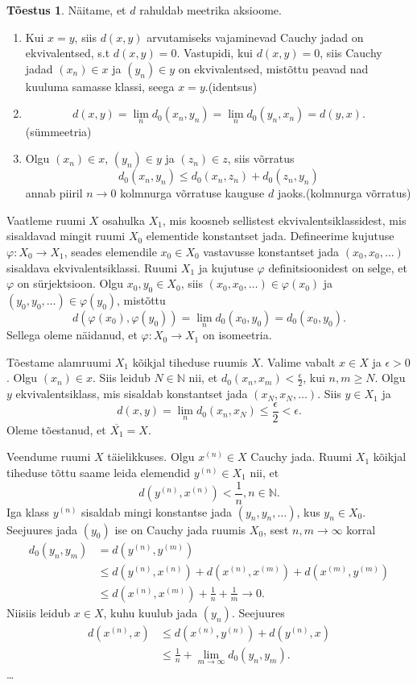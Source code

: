 \documentclass{article}[12pt]
\newcommand{\N}{\mathbb{N}}
\theoremstyle{definition}
\theoremstyle{definition}
\theoremstyle{definition}
\theoremstyle{break}
\newtheorem*{toestus}{Tõestus}
\begin{document}
\begin{toestus}
	Näitame, et $d$ rahuldab meetrika aksioome.
	\begin{enumerate}
		\item Kui $x=y$, siis $d(x,y)$ arvutamiseks vajaminevad Cauchy jadad on ekvivalentsed, s.t $d(x,y) = 0$.
		Vastupidi, kui $d(x,y)=0$, siis Cauchy jadad $(x_n)\in x$ ja $(y_n)\in y$ on ekvivalentsed, mistõttu peavad nad kuuluma samasse klassi, seega $x=y$.\hfill (identsus)
		\item 
		\[
			d(x,y) = \lim_n d_0(x_n,y_n) = \lim_n d_0(y_n,x_n) = d(y,x).
		\]
		\hfill (sümmeetria)
		\item Olgu $(x_n)\in x$, $(y_n)\in y$ ja $(z_n)\in z$, siis võrratus
		\[
			d_0(x_n,y_n) \leq d_0(x_n,z_n) + d_0(z_n,y_n)
		\]
		annab piiril $n\rightarrow 0$ kolmnurga võrratuse kauguse $d$ jaoks.\hfill (kolmnurga võrratus)
	\end{enumerate}
	
	Vaatleme ruumi $X$ osahulka $X_1$, mis koosneb sellistest ekvivalentsiklassidest, mis sisaldavad mingit ruumi $X_0$ elementide konstantset jada.
	Defineerime kujutuse $\varphi:X_0\rightarrow X_1$, seades elemendile $x_0\in X_0$ vastavusse konstantset jada $(x_0,x_0,\dots)$ sisaldava ekvivalentsiklassi.
	Ruumi $X_1$ ja kujutuse $\varphi$ definitsioonidest on selge, et $\varphi$ on sürjektsioon. Olgu $x_0,y_0\in X_0$, siis $(x_0,x_0,\dots)\in\varphi(x_0)$ ja $(y_0,y_0,\dots)\in\varphi(y_0)$, mistõttu
	\[
		d(\varphi(x_0),\varphi(y_0)) = \lim_n d_0(x_0,y_0) = d_0(x_0,y_0).
	\]
	Sellega oleme näidanud, et $\varphi: X_0\rightarrow X_1$ on isomeetria.

	Tõestame alamruumi $X_1$ kõikjal tiheduse ruumis $X$. Valime vabalt $x\in X$ ja $\epsilon > 0$. Olgu $(x_n)\in x$. Siis leidub $N\in\N$ nii, et $d_0(x_n,x_m) < \frac{\epsilon}{2}$, kui $n,m \geq N$. Olgu $y$ ekvivalentsiklass, mis sisaldab konstantset jada $(x_N,x_N,\dots)$. Siis $y\in X_1$ ja
	\[
		d(x,y) = \lim_n d_0(x_n,x_N) \leq \frac{\epsilon}{2} < \epsilon.
	\]
	Oleme tõestanud, et $\overline{X_1} = X$.

	Veendume ruumi $X$ täielikkuses.
	Olgu $x^{(n)}\in X$ Cauchy jada. Ruumi $X_1$ kõikjal tiheduse tõttu saame leida elemendid $y^{(n)}\in X_1$ nii, et
	\[
		d(y^{(n)}, x^{(n)}) < \frac{1}{n},n\in\N.
	\]
	Iga klass $y^{(n)}$ sisaldab mingi konstantse jada $(y_n,y_n,\dots)$, kus $y_n\in X_0$. Seejuures jada $(y_0)$ ise on Cauchy jada ruumis $X_0$, sest $n,m\rightarrow\infty$ korral
	\begin{align*}
		d_0(y_n,y_m) &= d(y^{(n)}, y^{(m)}) \\
		&\leq d(y^{(n)}, x^{(n)}) + d(x^{(n)}, x^{(m)}) + d(x^{(m)}, y^{(m)}) \\
		&\leq d(x^{(n)}, x^{(m)}) + \frac{1}{n} + \frac{1}{m} \rightarrow 0.
	\end{align*}
	Niisiis leidub $x\in X$, kuhu kuulub jada $(y_n)$.
	Seejuures
	\begin{align*}
		d(x^{(n)},x) &\leq d(x^{(n)}, y^{(n)}) + d(y^{(n)},x) \\
		&\leq \frac{1}{n} + \lim_{m\rightarrow \infty} d_0(y_n,y_m).
	\end{align*}
	\dots

\end{toestus}
\end{document}
